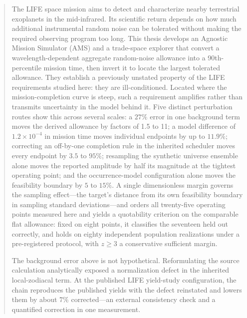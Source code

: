 \documentclass[12pt,a4paper]{article}
\numberwithin{equation}{section}
\numberwithin{figure}{section}
\numberwithin{table}{section}
\begin{document}
\begin{abstract}
    The LIFE space mission aims to detect and characterize nearby terrestrial exoplanets in the mid-infrared. Its scientific return depends on how much additional instrumental random noise can be tolerated without making the required observing program too long. This thesis develops an Agnostic Mission Simulator (AMS) and a trade-space explorer that convert a wavelength-dependent aggregate random-noise allowance into a 90th-percentile mission time, then invert it to locate the largest tolerated allowance. They establish a previously unstated property of the LIFE requirements studied here: they are ill-conditioned. Located where the mission-completion curve is steep, such a requirement amplifies rather than transmits uncertainty in the model behind it. Five distinct perturbation routes show this across several scales: a $27\%$ error in one background term moves the derived allowance by factors of 1.5 to 11; a model difference of $1.2\times10^{-4}$ in mission time moves individual endpoints by up to $11.9\%$; correcting an off-by-one completion rule in the inherited scheduler moves every endpoint by $3.5$ to $95\%$; resampling the synthetic universe ensemble alone moves the reported amplitude by half its magnitude at the tightest operating point; and the occurrence-model configuration alone moves the feasibility boundary by $5$ to $15\%$. A single dimensionless margin governs the sampling effect---the target's distance from its own feasibility boundary in sampling standard deviations---and orders all twenty-five operating points measured here and yields a quotability criterion on the comparable flat allowance: fixed on eight points, it classifies the seventeen held out correctly, and holds on eighty independent population realizations under a pre-registered protocol, with $z\geq3$ a conservative sufficient margin.

    The background error above is not hypothetical. Reformulating the source calculation analytically exposed a normalization defect in the inherited local-zodiacal term. At the published LIFE yield-study configuration, the chain reproduces the published yields with the defect reinstated and lowers them by about $7\%$ corrected---an external consistency check and a quantified correction in one measurement.


\end{abstract}
\end{document}
